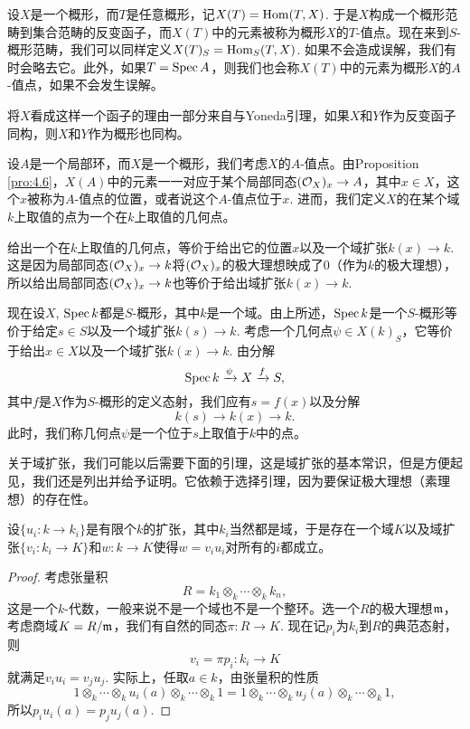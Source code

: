 \begin{para}[$T$-值点]
设$X$是一个概形，而$T$是任意概形，记$X(T)=\operatorname{Hom}(T,X)$. 于是$X$构成一个概形范畴到集合范畴的反变函子，而$X(T)$中的元素被称为概形$X$的$T$-值点。现在来到$S$-概形范畴，我们可以同样定义$X(T)_S=\operatorname{Hom}_S(T,X)$. 如果不会造成误解，我们有时会略去它。此外，如果$T=\operatorname{Spec} A$，则我们也会称$X(T)$中的元素为概形$X$的$A$-值点，如果不会发生误解。

将$X$看成这样一个函子的理由一部分来自与Yoneda引理，如果$X$和$Y$作为反变函子同构，则$X$和$Y$作为概形也同构。
\end{para}

\begin{para}[几何点]
设$A$是一个局部环，而$X$是一个概形，我们考虑$X$的$A$-值点。由Proposition \ref{pro:4.6}，$X(A)$中的元素一一对应于某个局部同态$(\mathcal{O}_X)_x\to A$，其中$x\in X$，这个$x$被称为$A$-值点的位置，或者说这个$A$-值点位于$x$. 进而，我们定义$X$的在某个域$k$上取值的点为一个在$k$上取值的几何点。

给出一个在$k$上取值的几何点，等价于给出它的位置$x$以及一个域扩张$k(x)\to k$. 这是因为局部同态$(\mathcal{O}_X)_x\to k$将$(\mathcal{O}_X)_x$的极大理想映成了$0$（作为$k$的极大理想），所以给出局部同态$(\mathcal{O}_X)_x\to k$也等价于给出域扩张$k(x)\to k$. 

现在设$X$, $\operatorname{Spec} k$都是$S$-概形，其中$k$是一个域。由上所述，$\operatorname{Spec} k$是一个$S$-概形等价于给定$s\in S$以及一个域扩张$k(s)\to k$. 考虑一个几何点$\psi\in X(k)_S$，它等价于给出$x\in X$以及一个域扩张$k(x)\to k$. 由分解
\[
	\operatorname{Spec} k \xrightarrow{\psi} X\xrightarrow{f} S,
\]
其中$f$是$X$作为$S$-概形的定义态射，我们应有$s=f(x)$以及分解
\[
	k(s)\to k(x)\to k.
\]
此时，我们称几何点$\psi$是一个位于$s$上取值于$k$中的点。
\end{para}

关于域扩张，我们可能以后需要下面的引理，这是域扩张的基本常识，但是方便起见，我们还是列出并给予证明。它依赖于选择引理，因为要保证极大理想（素理想）的存在性。

\begin{lem}\label{composite_ext}
设$\{u_i:k\to k_i\}$是有限个$k$的扩张，其中$k_i$当然都是域，于是存在一个域$K$以及域扩张$\{v_i:k_i\to K\}$和$w:k\to K$使得$w=v_iu_i$对所有的$i$都成立。
\end{lem}

\begin{proof}
考虑张量积
\[
	R=k_1\otimes_k \cdots \otimes_k k_n,
\]
这是一个$k$-代数，一般来说不是一个域也不是一个整环。选一个$R$的极大理想$\mathfrak{m}$，考虑商域$K=R/\mathfrak{m}$，我们有自然的同态$\pi:R\to K$. 现在记$p_i$为$k_i$到$R$的典范态射，则
\[
	v_i=\pi p_i:k_i\to K
\]
就满足$v_iu_i=v_ju_j$. 实际上，任取$a\in k$，由张量积的性质
\[
	1\otimes_k \cdots\otimes_k u_i(a)\otimes_k \cdots\otimes_k 1=1\otimes_k \cdots\otimes_k u_j(a)\otimes_k \cdots\otimes_k 1,
\]
所以$p_iu_i(a)=p_ju_j(a)$. 
\end{proof}

